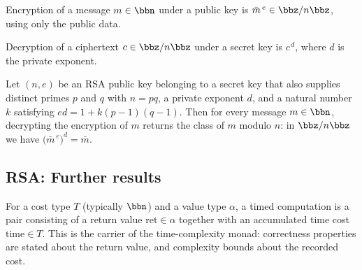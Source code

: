 \begin{definition}
\label{RSA.encrypt}
\leanok
{}
Encryption of a message $m \in \bbn$ under a public key is $\bar m^{\,e} \in \bbz/n\bbz$, using
only the public data.
\end{definition}

\begin{definition}
\label{RSA.decrypt}
\leanok
{}
Decryption of a ciphertext $c \in \bbz/n\bbz$ under a secret key is $c^{\,d}$, where $d$ is the
private exponent.
\end{definition}

\begin{theorem}
\label{RSA.rsa_correctness}
\leanok
{}
Let $(n,e)$ be an RSA public key belonging to a secret key that also supplies distinct
primes $p$ and $q$ with $n = pq$, a private exponent $d$, and a natural number $k$
satisfying $ed = 1 + k(p-1)(q-1)$. Then for every message $m \in \bbn$, decrypting the
encryption of $m$ returns the class of $m$ modulo $n$: in $\bbz/n\bbz$ we have
$\bigl(\bar m^{\,e}\bigr)^{d} = \bar m$.
\end{theorem}

\subsection*{RSA: Further results}

\begin{definition}
\label{TimeM}
\leanok
For a cost type $T$ (typically $\bbn$) and a value type $\alpha$, a timed computation is
a pair consisting of a return value $\mathrm{ret} \in \alpha$ together with an
accumulated time cost $\mathrm{time} \in T$. This is the carrier of the time-complexity
monad: correctness properties are stated about the return value, and complexity bounds
about the recorded cost.
\end{definition}
